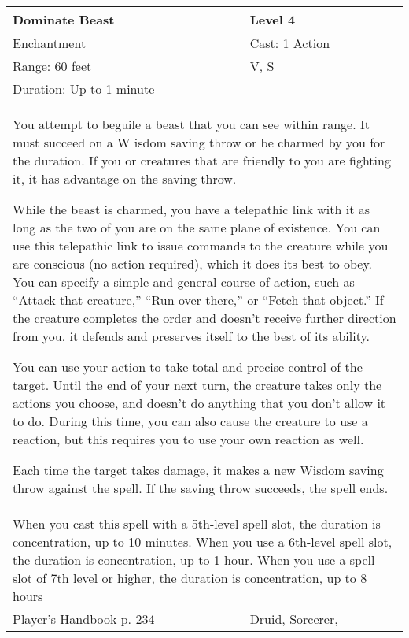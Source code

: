 \documentclass[11pt]{report}
\begin{document}
\begin{table}[H]
	\begin{tabular}{||p{6cm}|p{6cm}||}
		\hline\hline
		\bf{Dominate Beast} & Level 4\\ \hline
		Enchantment & Cast: 1 Action\\ \hline
		Range: 60 feet & V, S\\ \hline
		Duration: Up to 1 minute & \\ \hline
		\multicolumn{2}{||p{12cm}||}{You attempt to beguile a beast that you can see within range. 
It must succeed on a W isdom saving throw or be charmed by you for the duration. If you or creatures that are friendly to you are fighting it, it has advantage on the saving throw. 

While the beast is charmed, you have a telepathic link with it as long as the two of you are on the same plane of existence. You can use this telepathic link to issue commands to the creature while you are conscious (no action required), which it does its best to obey. You can specify a simple and general course of action, such as “Attack that creature,” “Run over there,” or “Fetch that object.” If the creature completes the order and doesn’t receive further direction from you, it defends and preserves itself to the best of its ability. 

You can use your action to take total and precise control of the target. Until the end of your next turn, the creature takes only the actions you choose, and doesn’t do anything that you don’t allow it to do. During this time, you can also cause the creature to use a reaction, but this requires you to use your own reaction as well. 

Each time the target takes damage, it makes a new Wisdom saving throw against the spell. If the saving throw succeeds, the spell ends.}\\ \hline
		\multicolumn{2}{||p{12cm}||}{When you cast this spell with a 5th-level spell slot, the duration is concentration, up to 10 minutes. 
When you use a 6th-level spell slot, the duration is concentration, up to 1 hour. 
When you use a spell slot of 7th level or higher, the duration is concentration, up to 8 hours}\\ \hline
Player's Handbook p. 234 & Druid, Sorcerer, \\ \hline\hline
	\end{tabular}
\end{table}
\end{document}
